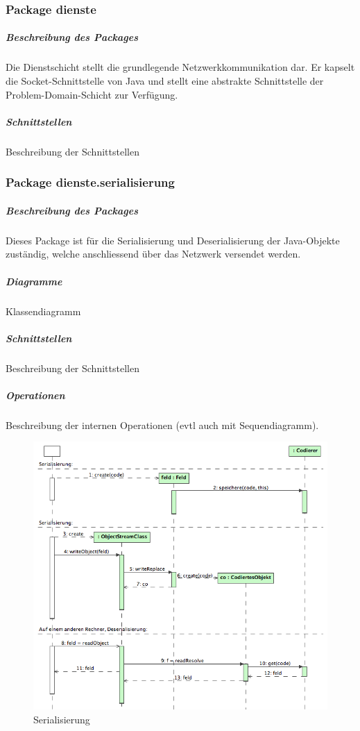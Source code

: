 \documentclass[a4paper,12pt,halfparskip,DIV14]{scrartcl}
\begin{document}
\clearpage
\subsubsection{Package dienste} %
\label{ssub:package_dienste}
\subparagraph{Beschreibung des Packages} %
\label{ssub:beschreibung_des_packages}
Die Dienstschicht stellt die grundlegende Netzwerkkommunikation dar. Er kapselt die Socket-Schnittstelle von Java und stellt eine abstrakte Schnittstelle der Problem-Domain-Schicht zur Verfügung.
\subparagraph{Schnittstellen} %
\label{ssub:schnittstellen}
Beschreibung der Schnittstellen

\clearpage
\subsubsection{Package dienste.serialisierung} %
\label{ssub:package_dienste_serialisierung}
\subparagraph{Beschreibung des Packages} %
\label{ssub:beschreibung_des_packages}
Dieses Package ist für die Serialisierung und Deserialisierung der Java-Objekte zuständig, welche anschliessend über das Netzwerk versendet werden.
\subparagraph{Diagramme} %
\label{ssub:diagramme}
Klassendiagramm
\subparagraph{Schnittstellen} %
\label{ssub:schnittstellen}
Beschreibung der Schnittstellen
\subparagraph{Operationen} %
\label{ssub:operationen}
Beschreibung der internen Operationen (evtl auch mit Sequendiagramm).
\begin{figure}
	[htp] \centering 
	\includegraphics[width=1\textwidth]{dienste_serialisierung.png} \caption{Serialisierung}\label{fig:dienste_serialisierung.png} 
\end{figure}
\end{document}
